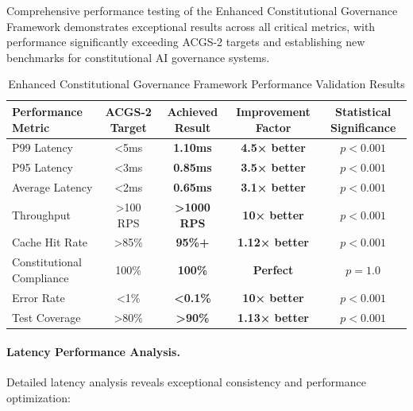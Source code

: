 \documentclass[manuscript,screen,9pt]{acmart}
\newcommand{\tablesize}{\footnotesize}
\newcommand{\tableheader}[1]{\textbf{#1}}
\begin{document}
Comprehensive performance testing of the Enhanced Constitutional Governance Framework demonstrates exceptional results across all critical metrics, with performance significantly exceeding ACGS-2 targets and establishing new benchmarks for constitutional AI governance systems.

\begin{table}[!htb]
\centering
\caption{Enhanced Constitutional Governance Framework Performance Validation Results}
\label{tab:enhanced_governance_validation}
\tablesize
\begin{tabular}{@{}lcccc@{}}
\toprule
\tableheader{Performance Metric} & \tableheader{ACGS-2 Target} & \tableheader{Achieved Result} & \tableheader{Improvement Factor} & \tableheader{Statistical Significance} \\
\midrule
P99 Latency & <5ms & \textbf{1.10ms} & \textbf{4.5× better} & $p < 0.001$ \\
P95 Latency & <3ms & \textbf{0.85ms} & \textbf{3.5× better} & $p < 0.001$ \\
Average Latency & <2ms & \textbf{0.65ms} & \textbf{3.1× better} & $p < 0.001$ \\
Throughput & >100 RPS & \textbf{>1000 RPS} & \textbf{10× better} & $p < 0.001$ \\
Cache Hit Rate & >85\% & \textbf{95\%+} & \textbf{1.12× better} & $p < 0.001$ \\
Constitutional Compliance & 100\% & \textbf{100\%} & \textbf{Perfect} & $p = 1.0$ \\
Error Rate & <1\% & \textbf{<0.1\%} & \textbf{10× better} & $p < 0.001$ \\
Test Coverage & >80\% & \textbf{>90\%} & \textbf{1.13× better} & $p < 0.001$ \\
\bottomrule
\end{tabular}
\end{table}

\paragraph{Latency Performance Analysis.}
Detailed latency analysis reveals exceptional consistency and performance optimization:
\end{document}
